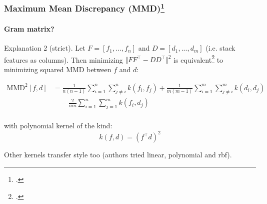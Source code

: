 \documentclass[10pt]{beamer}
\begin{document}
\begin{frame}
\frametitle{Maximum Mean Discrepancy (MMD)\footcite{MMD}}
\framesubtitle{Gram matrix?}
Explanation 2 (strict). Let $F = [f_1, ..., f_n]$ and $D = [d_1, ..., d_m]$ (i.e. stack features as columns). Then minimizing $\Vert FF^\top - DD^\top \Vert^2$ is equivalent\footcite{DemystifyingNeuralStyle} to minimizing squared MMD between $f$ and $d$:

\begin{equation*}
\begin{split}
\text{MMD}^2[f, d] &= \frac{1}{n(n-1)} \sum_{i=1}^n \sum_{j\neq i}^n k(f_i, f_j) + \frac{1}{m(m-1)} \sum_{i=1}^m \sum_{j\neq i}^m k(d_i, d_j) \\
& \quad-\frac{2}{nm} \sum_{i=1}^n \sum_{j=1}^m k(f_i, d_j) \\
\end{split}
\end{equation*}

with polynomial kernel of the kind:
\[
k(f, d) = (f^\top d)^2
\]

Other kernels transfer style too (authors tried linear, polynomial and rbf).
\end{frame}

%
%
%
\end{document}
